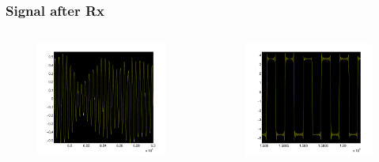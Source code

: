 \documentclass[11pt]{beamer} %
\begin{document}
\begin{frame}
 \frametitle{Signal after Rx}
 \begin{columns}[T]
        \begin{column}{.5\textwidth}
           
            \begin{figure}
\includegraphics[width=1\textwidth]{Figures/RxEkosignalStarkEjMattnad.pdf}
\end{figure}
 
        \end{column}
         \begin{column}{.5\textwidth}

      \begin{figure}
\includegraphics[width=1\textwidth]{Figures/RxEkosignalStarkMattnad.pdf}
\end{figure}

        \end{column}
\end{columns}
\end{frame}
\end{document}
